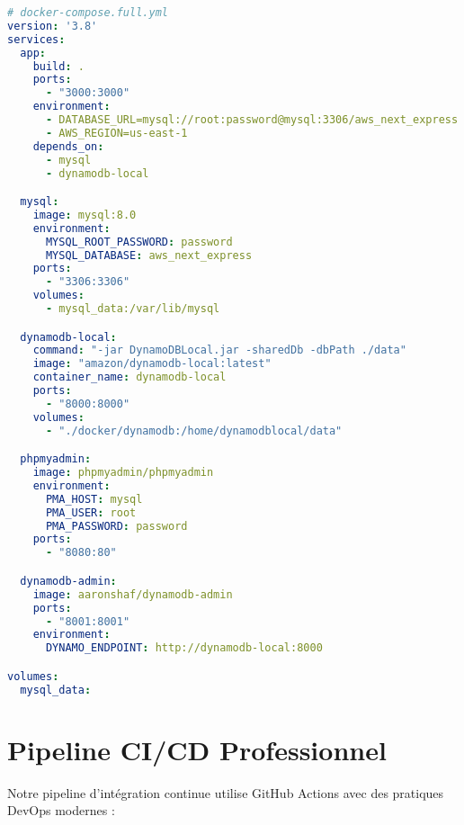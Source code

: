 \documentclass[12pt,a4paper]{report}
\begin{document}
\begin{lstlisting}[language=yaml, caption=Docker Compose complet]
# docker-compose.full.yml
version: '3.8'
services:
  app:
    build: .
    ports:
      - "3000:3000"
    environment:
      - DATABASE_URL=mysql://root:password@mysql:3306/aws_next_express
      - AWS_REGION=us-east-1
    depends_on:
      - mysql
      - dynamodb-local

  mysql:
    image: mysql:8.0
    environment:
      MYSQL_ROOT_PASSWORD: password
      MYSQL_DATABASE: aws_next_express
    ports:
      - "3306:3306"
    volumes:
      - mysql_data:/var/lib/mysql

  dynamodb-local:
    command: "-jar DynamoDBLocal.jar -sharedDb -dbPath ./data"
    image: "amazon/dynamodb-local:latest"
    container_name: dynamodb-local
    ports:
      - "8000:8000"
    volumes:
      - "./docker/dynamodb:/home/dynamodblocal/data"

  phpmyadmin:
    image: phpmyadmin/phpmyadmin
    environment:
      PMA_HOST: mysql
      PMA_USER: root
      PMA_PASSWORD: password
    ports:
      - "8080:80"

  dynamodb-admin:
    image: aaronshaf/dynamodb-admin
    ports:
      - "8001:8001"
    environment:
      DYNAMO_ENDPOINT: http://dynamodb-local:8000

volumes:
  mysql_data:
\end{lstlisting}

\section{Pipeline CI/CD Professionnel}

Notre pipeline d'intégration continue utilise GitHub Actions avec des pratiques DevOps modernes :
\end{document}
